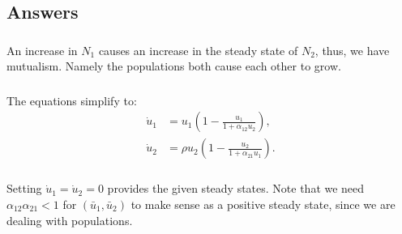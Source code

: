 \documentclass[]{article}
\renewcommand{\l}{\left(}
\renewcommand{\r}{\right)}
\begin{document}
\begin{Answ}
\subsection{Answers}
\subsubsection{}
An increase in $N_1$ causes an increase in the steady state of $N_2$, thus, we have mutualism. Namely the populations both cause each other to grow.
\subsubsection{}
The equations simplify to:
\begin{align}
\dot{u}_1&=u_1\l 1-\frac{u_1}{1+\alpha_{12}u_2}\r,\\
\dot{u}_2&=\rho u_2\l 1-\frac{u_2}{1+\alpha_{21}u_1}\r.
\end{align}
\subsubsection{}
Setting $\dot{u}_1=\dot{u}_2=0$ provides the given steady states. Note that we need $\alpha_{12}\alpha_{21}<1$ for $(\bar{u}_1,\bar{u}_2)$ to make sense as a positive steady state, since we are dealing with populations.

\end{Answ}
\end{document}
